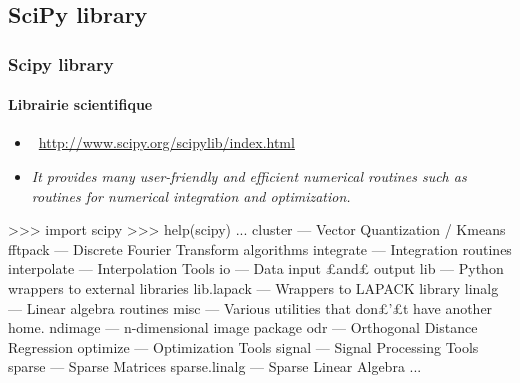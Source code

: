 \subsection{SciPy library}
\begin{frame}[fragile]
\frametitle{Scipy library}
\framesubtitle{Librairie scientifique}
\begin{itemize}
 \item {} \, \url{http://www.scipy.org/scipylib/index.html}
 \item \emph{It provides many user-friendly and efficient numerical routines such as routines for numerical integration and optimization.}
\end{itemize}
\begin{pythonConsole}
>>> import scipy
>>> help(scipy)
	...
     cluster                      --- Vector Quantization / Kmeans
     fftpack                      --- Discrete Fourier Transform algorithms
     integrate                    --- Integration routines
     interpolate                  --- Interpolation Tools
     io                           --- Data input £and£ output
     lib                          --- Python wrappers to external libraries
     lib.lapack                   --- Wrappers to LAPACK library
     linalg                       --- Linear algebra routines
     misc                         --- Various utilities that don£'£t have
                                      another home.
     ndimage                      --- n-dimensional image package
     odr                          --- Orthogonal Distance Regression
     optimize                     --- Optimization Tools
     signal                       --- Signal Processing Tools
     sparse                       --- Sparse Matrices
     sparse.linalg                --- Sparse Linear Algebra
    ...
\end{pythonConsole}
\end{frame}
